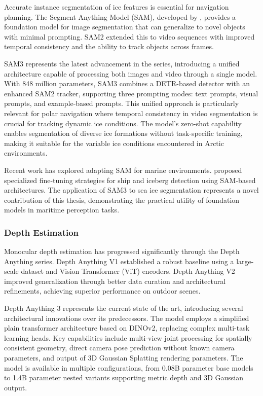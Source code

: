 Accurate instance segmentation of ice features is essential for navigation planning. The Segment Anything Model (SAM), developed by \citeauthor{kirillov2023segment}, provides a foundation model for image segmentation that can generalize to novel objects with minimal prompting. SAM2 \parencite{ravi2024sam2} extended this to video sequences with improved temporal consistency and the ability to track objects across frames.

SAM3 \parencite{kirillov2026sam3} represents the latest advancement in the series, introducing a unified architecture capable of processing both images and video through a single model. With 848 million parameters, SAM3 combines a DETR-based detector with an enhanced SAM2 tracker, supporting three prompting modes: text prompts, visual prompts, and example-based prompts. This unified approach is particularly relevant for polar navigation where temporal consistency in video segmentation is crucial for tracking dynamic ice conditions. The model's zero-shot capability enables segmentation of diverse ice formations without task-specific training, making it suitable for the variable ice conditions encountered in Arctic environments.

Recent work has explored adapting SAM for marine environments. \citeauthor{zhang2024marine} proposed specialized fine-tuning strategies for ship and iceberg detection using SAM-based architectures. The application of SAM3 to sea ice segmentation represents a novel contribution of this thesis, demonstrating the practical utility of foundation models in maritime perception tasks.

\subsubsection{Depth Estimation}

Monocular depth estimation has progressed significantly through the Depth Anything series. Depth Anything V1 \parencite{depthanything2023} established a robust baseline using a large-scale dataset and Vision Transformer (ViT) encoders. Depth Anything V2 \parencite{depthanythingv22024} improved generalization through better data curation and architectural refinements, achieving superior performance on outdoor scenes.

Depth Anything 3 \parencite{zhang2025depthanything3} represents the current state of the art, introducing several architectural innovations over its predecessors. The model employs a simplified plain transformer architecture based on DINOv2, replacing complex multi-task learning heads. Key capabilities include multi-view joint processing for spatially consistent geometry, direct camera pose prediction without known camera parameters, and output of 3D Gaussian Splatting rendering parameters. The model is available in multiple configurations, from 0.08B parameter base models to 1.4B parameter nested variants supporting metric depth and 3D Gaussian output.

